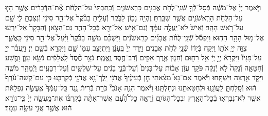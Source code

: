 \documentclass[twoside, openany, parskip=half, 11pt]{book}
\begin{document}
\begin{footnotesize}
\begin{multicols}{2}

\\
\\
וַיֹּ֤אמֶר יְיָ֙ אֶל־מֹשֶׁ֔ה פְּֿסָל־לְֿךָ֛ שְֿׁנֵֽי־לֻחֹ֥ת אֲבָנִ֖ים כָּרִֽאשֹׁנִ֑ים וְֿכָֽתַבְתִּי֙ עַל־הַלֻּחֹ֔ת אֶ֨ת־הַדְּֿבָרִ֔ים אֲשֶׁ֥ר הָי֛וּ עַל־הַלֻּחֹ֥ת הָרִֽאשֹׁנִ֖ים אֲשֶׁ֥ר שִׁבַּֽרְתָּ׃ וֶהְיֵ֥ה נָכ֖וֹן לַבֹּ֑קֶר וְֿעָלִ֤יתָ בַבֹּ֨קֶר֙ אֶל־הַ֣ר סִינַ֔י וְֿנִצַּבְתָּ֥ לִ֛י שָׁ֖ם עַל־רֹ֥אשׁ הָהָֽר׃ וְֿאִישׁ֙ לֹא־יַֽעֲלֶ֣ה עִמָּ֔ךְ וְֿגַם־אִ֥ישׁ אַל־יֵרָ֖א בְּֿכׇל־הָהָ֑ר גַּם־הַצֹּ֤אן וְֿהַבָּקָר֙ אַל־יִרְע֔וּ אֶל־מ֖וּל הָהָ֥ר הַהֽוּא׃ וַיִּפְסֹ֡ל שְֿׁנֵֽי־לֻחֹ֨ת אֲבָנִ֜ים כָּרִֽאשֹׁנִ֗ים וַיַּשְׁכֵּ֨ם מֹשֶׁ֤ה בַבֹּ֨קֶר֙ וַיַּ֨עַל֙ אֶל־הַ֣ר סִינַ֔י כַּֽאֲשֶׁ֛ר צִוָּ֥ה יְיָ֖ אֹת֑וֹ וַיִּקַּ֣ח בְּֿיָד֔וֹ שְֿׁנֵ֖י לֻחֹ֥ת אֲבָנִֽים׃ וַיֵּ֤רֶד יְיָ֙ בֶּֽעָנָ֔ן וַיִּתְיַצֵּ֥ב עִמּ֖וֹ שָׁ֑ם וַיִּקְרָ֥א בְֿשֵׁ֖ם יְיָ׃ וַיַּֽעֲבֹ֨ר יְיָ֥ עַל־פָּנָיו֘ וַיִּקְרָא֒ יְיָ֣ יְיָ֔ אֵ֥ל רַח֖וּם וְֿחַנּ֑וּן אֶ֥רֶךְ אַפַּ֖יִם וְֿרַב־חֶ֥סֶד וֶֽאֱמֶֽת׃ נֹצֵ֥ר חֶ֨סֶד֙ לָֽאֲלָפִ֔ים נֹשֵׂ֥א עָוֹ֛ן וָפֶ֖שַׁע וְֿחַטָּאָ֑ה וְֿנַקֵּה֙ לֹ֣א יְֿנַקֶּ֔ה פֹּקֵ֣ד עֲוֹ֣ן אָב֗וֹת עַל־בָּנִים֙ וְֿעַל־בְּֿנֵ֣י בָנִ֔ים עַל־שִׁלֵּשִׁ֖ים וְֿעַל־רִבֵּעִֽים׃ וַיְֿמַהֵ֖ר מֹשֶׁ֑ה וַיִּקֹּ֥ד אַ֖רְצָה וַיִּשְׁתָּֽחוּ׃ וַיֹּ֡אמֶר אִם־נָא֩ מָצָ֨אתִי חֵ֤ן בְּֿעֵינֶ֨יךָ֙ אֲדֹנָ֔י יֵֽלֶךְ־נָ֥א אֲדֹנָ֖י בְּֿקִרְבֵּ֑נוּ כִּ֤י עַם־קְשֵׁה־עֹ֨רֶף֙ ה֔וּא וְֿסָֽלַחְתָּ֛ לַֽעֲוֹנֵ֥נוּ וּלְחַטָּאתֵ֖נוּ וּנְחַלְתָּֽנוּ׃ וַיֹּ֗אמֶר הִנֵּ֣ה אָנֹכִי֘ כֹּרֵ֣ת בְּֿרִית֒ נֶ֤גֶד כָּֽל־עַמְּֿךָ֙ אֶֽעֱשֶׂ֣ה נִפְלָאֹ֔ת אֲשֶׁ֛ר לֹֽא־נִבְרְא֥וּ בְֿכׇל־הָאָ֖רֶץ וּבְכׇל־הַגּוֹיִ֑ם וְֿרָאָ֣ה כׇל־הָ֠עָ֠ם אֲשֶׁר־אַתָּ֨ה בְֿקִרְבּ֜וֹ אֶת־מַֽעֲשֵׂ֤ה יְיָ֙ כִּֽי־נוֹרָ֣א ה֔וּא אֲשֶׁ֥ר אֲנִ֖י עֹשֶׂ֥ה עִמָּֽךְ׃

\end{multicols}
\end{footnotesize}
\end{document}
